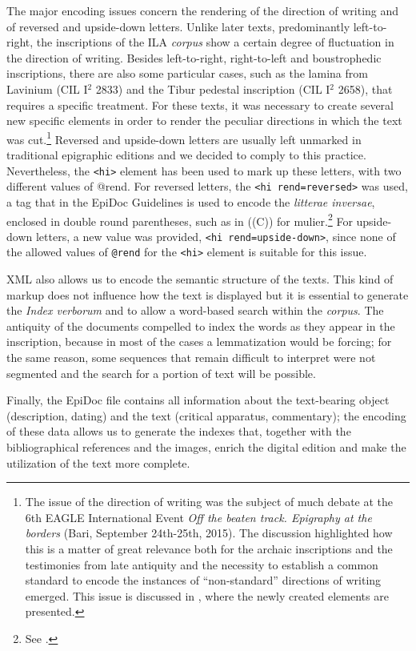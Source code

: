 \documentclass[amsthm,ebook]{saparticle}
\begin{document}
The major encoding issues concern the rendering of the direction of writing and of reversed and upside-down letters.
Unlike later texts, predominantly left-to-right, the inscriptions of the ILA \emph{corpus} show a certain degree of
fluctuation in the direction of writing. Besides left-to-right, right-to-left and boustrophedic inscriptions, there are
also some particular cases, such as the lamina from Lavinium (CIL I$^2$ 2833) and the Tibur pedestal inscription (CIL I$^2$
2658), that requires a specific treatment. For these texts, it was necessary to create several new specific elements in order to render the peculiar directions in
which the text was cut.\footnote{The issue of the direction of writing was the subject of much debate at the 6th EAGLE
International Event \emph{Off the beaten track. Epigraphy at the borders} (Bari, September 24th{}-25th, 2015). The discussion
highlighted how this is a matter of great relevance both for the archaic inscriptions and the testimonies from late
antiquity and the necessity to establish a common standard to encode the instances of ``non-standard'' directions of
writing emerged. This issue is discussed in \citet{SarulloBari}, where the newly created elements are presented.}
Reversed and upside-down letters are usually left unmarked in traditional epigraphic editions and we decided to comply
to this practice. Nevertheless, the \texttt{{\textless}hi{\textgreater}} element has been used to mark up these letters, with
two different values of @rend. For reversed letters, the \texttt{{\textless}hi
rend={\textquotedbl}reversed{\textquotedbl}{\textgreater}} was used, a tag that in the EpiDoc Guidelines is used to
encode the \emph{litterae inversae}, enclosed in double round parentheses, such as in ((C)) for mulier.\footnote{See \citet[1722]{panciera_i_2006}.} For upside-down letters, a new value was provided, \texttt{{\textless}hi
rend={\textquotedbl}upside-down{\textquotedbl}{\textgreater}}, since none of the allowed values of \texttt{@rend} for the
\texttt{{\textless}hi{\textgreater}} element is suitable for this issue.

XML also allows us to encode the semantic structure of the texts. This kind of markup does not influence how the text is
displayed but it is essential to generate the \emph{Index verborum} and to allow a word-based search within the \emph{corpus}. The
antiquity of the documents compelled to index the words as they appear in the inscription, because in most of the cases
a lemmatization would be forcing; for the same reason, some sequences that remain difficult to interpret were not
segmented and the search for a portion of text will be possible. 

Finally, the EpiDoc file contains all information about the text-bearing object (description, dating) and the text
(critical apparatus, commentary); the encoding of these data allows us to generate the indexes that, together with the
bibliographical references and the images, enrich the digital edition and make the utilization of the text more
complete. 

\nocite{colonna_iscrizioni_2007}


\end{document}
